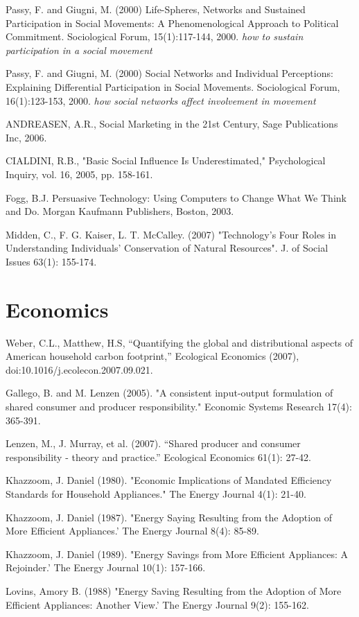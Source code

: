 Passy, F. and Giugni, M. (2000) Life-Spheres, Networks and Sustained Participation in Social Movements: A Phenomenological Approach to Political Commitment. Sociological Forum, 15(1):117-144, 2000. \emph{how to sustain participation in a social movement}

Passy, F. and Giugni, M. (2000) Social Networks and Individual Perceptions: Explaining Differential Participation in Social Movements. Sociological Forum, 16(1):123-153, 2000. \emph{how social networks affect involvement in movement}

ANDREASEN, A.R., Social Marketing in the 21st Century, Sage Publications Inc, 2006.

CIALDINI, R.B., "Basic Social Influence Is Underestimated," Psychological Inquiry,  vol. 16, 2005, pp. 158-161.

Fogg, B.J.  Persuasive Technology: Using Computers to Change What We Think and Do.  Morgan Kaufmann Publishers, Boston, 2003.

Midden, C., F. G. Kaiser, L. T. McCalley. (2007) "Technology’s Four Roles in Understanding Individuals’ Conservation of Natural Resources". J. of Social Issues 63(1): 155-174.



\section{Economics}
Weber, C.L., Matthew, H.S, “Quantifying the global and distributional 
aspects of American household carbon footprint,” Ecological Economics 
(2007), doi:10.1016/j.ecolecon.2007.09.021. 

Gallego, B. and M. Lenzen (2005). "A consistent input-output formulation of shared consumer and producer responsibility." Economic Systems Research 17(4): 
365-391.

Lenzen, M., J. Murray, et al. (2007). ``Shared producer and consumer responsibility - theory and practice.'' Ecological Economics 61(1): 27-42.

Khazzoom, J. Daniel (1980). "Economic Implications of Mandated Efficiency Standards for Household Appliances." The Energy Journal 4(1): 21-40.

Khazzoom, J. Daniel (1987). "Energy Saying Resulting from the Adoption of More Efficient Appliances.' The Energy Journal 8(4): 85-89.

Khazzoom, J. Daniel (1989). "Energy Savings from More Efficient Appliances: A Rejoinder.' The Energy Journal 10(1): 157-166.

Lovins, Amory B. (1988) "Energy Saving Resulting from the Adoption of More Efficient Appliances: Another View.' The Energy Journal 9(2): 155-162.



